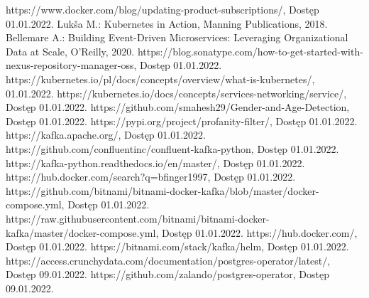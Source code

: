 \documentclass[12pt,twoside]{article}
\begin{document}
\begin{thebibliography}{4}
https://www.docker.com/blog/updating-product-subscriptions/, Dostęp 01.01.2022.
Lukša M.: Kubernetes in Action, Manning Publications, 2018.
 Bellemare A.: Building Event-Driven Microservices: Leveraging Organizational Data at Scale, O'Reilly, 2020.
https://blog.sonatype.com/how-to-get-started-with-nexus-repository-manager-oss, Dostęp 01.01.2022.
https://kubernetes.io/pl/docs/concepts/overview/what-is-kubernetes/, 01.01.2022.
https://kubernetes.io/docs/concepts/services-networking/service/, Dostęp 01.01.2022.
https://github.com/smahesh29/Gender-and-Age-Detection, Dostęp 01.01.2022.
https://pypi.org/project/profanity-filter/, Dostęp 01.01.2022.
https://kafka.apache.org/, Dostęp 01.01.2022.
https://github.com/confluentinc/confluent-kafka-python, Dostęp 01.01.2022.
https://kafka-python.readthedocs.io/en/master/, Dostęp 01.01.2022.
https://hub.docker.com/search?q=bfinger1997, Dostęp 01.01.2022.
https://github.com/bitnami/bitnami-docker-kafka/blob/master/docker-compose.yml, Dostęp 01.01.2022.
https://raw.githubusercontent.com/bitnami/bitnami-docker-kafka/master/docker-compose.yml, Dostęp 01.01.2022.
https://hub.docker.com/, Dostęp 01.01.2022.
https://bitnami.com/stack/kafka/helm, Dostęp 01.01.2022.
https://access.crunchydata.com/documentation/postgres-operator/latest/, Dostęp 09.01.2022.
https://github.com/zalando/postgres-operator, Dostęp 09.01.2022.


\end{thebibliography}

\clearpage

\makesummary
\end{document}
